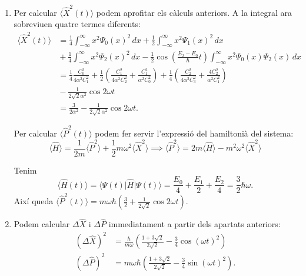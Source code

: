 \documentclass[12pt]{article}
\numberwithin{table}{section}
\numberwithin{figure}{section}
\numberwithin{equation}{section}
\newcommand{\ket}[1]{\vert #1 \rangle}
\newcommand{\bra}[1]{\langle #1 \vert}
\begin{document}
\begin{enumerate}[label=(\alph*), font=\bfseries \sffamily, wide, labelwidth=!, labelindent=0pt]
\item Per calcular \( \langle \hat{X}^2(t) \rangle \) podem aprofitar els càlculs anteriors. A la integral ara sobreviuen quatre termes diferents:
	\begin{align*}
		\langle \hat{X}^2(t) \rangle & = \frac{1}{4}\int_{-\infty}^{\infty} x^2 \Psi_0(x)^2 \, dx + \frac{1}{2}\int_{-\infty}^{\infty} x^2 \Psi_1(x)^2 \, dx \\
																 & {} + \frac{1}{4}\int_{-\infty}^{\infty} x^2 \Psi_2(x)^2 \, dx - \frac{1}{2} \cos{\left(\tfrac{E_2 - E_0}{\hbar}t\right)} \int_{-\infty}^{\infty} x^2 \Psi_0(x)\Psi_2(x) \, dx \\
																 & = \frac{1}{4} \frac{C_0^2}{4\alpha^2 C_1^2} + \frac{1}{2}\left(\frac{C_1^2}{4\alpha^2C_2^2} + \frac{C_1^2}{\alpha^2 C_0^2}\right) + \frac{1}{4}\left(\frac{C_2^2}{4\alpha^2 C_3^2} + \frac{4C_2^2}{\alpha^2C_1^2}\right) \\
																 & {} -\frac{1}{2\sqrt{2}\alpha^2} \cos{2\omega t} \\
																 & = \frac{3}{2\alpha^2} - \frac{1}{2\sqrt{2}\alpha^2} \cos{2\omega t}.
	\end{align*}

	Per calcular \( \langle \hat{P}^2(t) \rangle \) podem fer servir l'expressió del hamiltonià del sistema:
	\begin{equation*}
		\langle \hat{H} \rangle = \frac{1}{2m} \langle \hat{P}^2 \rangle + \frac{1}{2} m\omega^2 \langle \hat{X}^2 \rangle \implies \langle \hat{P}^2 \rangle = 2m\langle \hat{H} \rangle -  m^2\omega^2 \langle \hat{X}^2 \rangle
	\end{equation*}

	Tenim
	\begin{equation*}
		\langle \hat{H}(t) \rangle = \bra{\Psi(t)}\hat{H}\ket{\Psi(t)} = \frac{E_0}{4} + \frac{E_1}{2} + \frac{E_2}{4} = \frac{3}{2}\hbar \omega.
	\end{equation*}
	Així queda \( \langle \hat{P}^2(t) \rangle = m\omega\hbar\left(\tfrac{3}{2} + \tfrac{1}{2 \sqrt{2}}\cos{2\omega t}\right) \). 

\item Podem calcular \( \Delta \hat{X} \) i \( \Delta \hat{P} \) immediatament a partir dels apartats anteriors:
	\begin{align*}
		(\Delta \hat{X})^2 & = \frac{\hbar}{m\omega}\left(\frac{1 + 3\sqrt{2}}{2 \sqrt{2}} - \frac{3}{4}\cos{(\omega t)}^2\right)	\\
		(\Delta \hat{P})^2 & = m\omega\hbar \left(\frac{1 + 3\sqrt{2}}{2 \sqrt{2}} - \frac{3}{4}\sin{(\omega t)}^2\right).
	\end{align*}
	

\end{enumerate}
\end{document}
